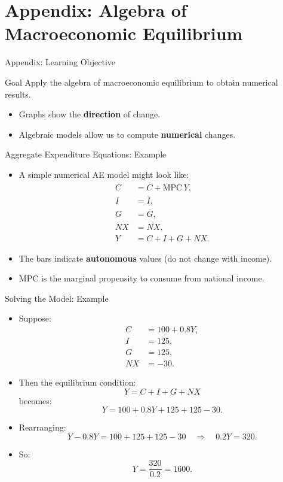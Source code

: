 \documentclass[aspectratio=169]{beamer}
\begin{document}
\section*{Appendix: Algebra of Macroeconomic Equilibrium}

\begin{frame}{Appendix: Learning Objective}
\transfade
\begin{block}{Goal}
Apply the algebra of macroeconomic equilibrium to obtain numerical results.
\end{block}
\begin{itemize}[<+->]
  \item Graphs show the \textbf{direction} of change.
  \item Algebraic models allow us to compute \textbf{numerical} changes.
\end{itemize}
\end{frame}

\begin{frame}{Aggregate Expenditure Equations: Example}
\transfade
\begin{itemize}[<+->]
  \item A simple numerical AE model might look like:
  \begin{align*}
    C &= \overline{C} + \text{MPC}\,Y,\\
    I &= \overline{I},\\
    G &= \overline{G},\\
    NX &= \overline{NX},\\
    Y &= C + I + G + NX.
  \end{align*}
  \item The bars indicate \textbf{autonomous} values (do not change with income).
  \item \(\text{MPC}\) is the marginal propensity to consume from national income.
\end{itemize}
\end{frame}

\begin{frame}{Solving the Model: Example}
\transfade
\begin{itemize}[<+->]
  \item Suppose:
  \begin{align*}
    C &= 100 + 0.8Y,\\
    I &= 125,\\
    G &= 125,\\
    NX &= -30.
  \end{align*}
  \item Then the equilibrium condition:
  \[
    Y = C + I + G + NX
  \]
  becomes:
  \[
    Y = 100 + 0.8Y + 125 + 125 - 30.
  \]
  \item Rearranging:
  \[
    Y - 0.8Y = 100 + 125 + 125 - 30
    \quad \Rightarrow \quad
    0.2Y = 320.
  \]
  \item So:
  \[
    Y = \frac{320}{0.2} = 1600.
  \]
\end{itemize}
\end{frame}
\end{document}
